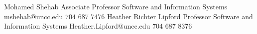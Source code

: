 %
%
%


\begin{referees}
		{Mohamed Shehab}
		{Associate Professor}
		{Software and Information Systems}
		{mshehab@uncc.edu}
		{\(704\) 687 7476}
		{Heather Richter Lipford}
		{Professor}
		{Software and Information Systems}
		{Heather.Lipford@uncc.edu}
		{\(704\) 687 8376}
\end{referees}